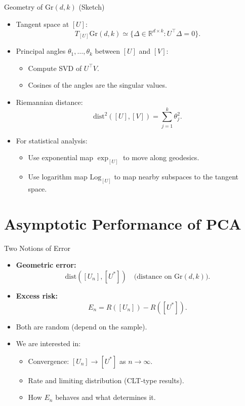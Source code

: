 \documentclass{beamer}
\newcommand{\R}{\mathbb{R}}
\newcommand{\Gr}{\mathrm{Gr}}
\newcommand{\1}{\mathbbm{1}}
\begin{document}
\begin{frame}{Geometry of $\Gr(d,k)$ (Sketch)} %
  \begin{itemize}
    \item Tangent space at $[U]$:
    \[
      T_{[U]}\Gr(d,k) \simeq \{ \Delta \in \R^{d\times k} : U^\top \Delta = 0 \}.
    \]
    \item Principal angles $\theta_1,\dots,\theta_k$ between $[U]$ and $[V]$:
    \begin{itemize}
      \item Compute SVD of $U^\top V$.
      \item Cosines of the angles are the singular values.
    \end{itemize}
    \item Riemannian distance:
    \[
      \mathrm{dist}^2([U],[V]) = \sum_{j=1}^k \theta_j^2.
    \]
    \item For statistical analysis:
    \begin{itemize}
      \item Use exponential map $\exp_{[U]}$ to move along geodesics.
      \item Use logarithm map $\mathrm{Log}_{[U]}$ to map nearby subspaces to the tangent space.
    \end{itemize}
  \end{itemize}
\end{frame}

\section{Asymptotic Performance of PCA}

\begin{frame}{Two Notions of Error} %
  \begin{itemize}
    \item \textbf{Geometric error:}
    \[
      \mathrm{dist}([U_n],[U^\ast])
      \quad\text{(distance on } \Gr(d,k)\text{)}.
    \]
    \item \textbf{Excess risk:}
    \[
      E_n = R([U_n]) - R([U^\ast]).
    \]
    \item Both are random (depend on the sample).
    \item We are interested in:
    \begin{itemize}
      \item Convergence: $[U_n] \to [U^\ast]$ as $n \to \infty$.
      \item Rate and limiting distribution (CLT-type results).
      \item How $E_n$ behaves and what determines it.
    \end{itemize}
  \end{itemize}
\end{frame}
\end{document}
